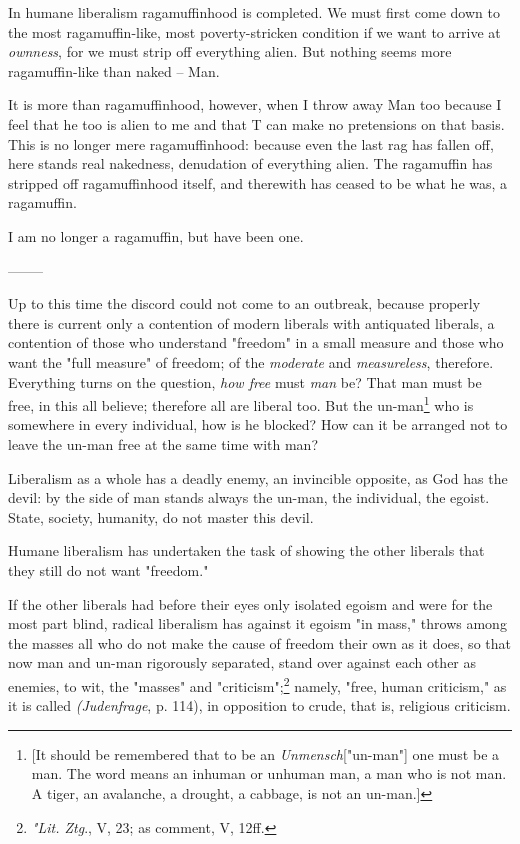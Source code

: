 \documentclass[a4paper]{book}
\begin{document}
In humane liberalism ragamuffinhood is completed. We must first come down to 
the most ragamuffin-like, most poverty-stricken condition if we want to arrive 
at \textit{ownness}, for we must strip off everything alien. But nothing seems 
more ragamuffin-like than naked -- Man.

It is more than ragamuffinhood, however, when I throw away Man too because I 
feel that he too is alien to me and that T can make no pretensions on that 
basis. This is no longer mere ragamuffinhood: because even the last rag has 
fallen off, here stands real nakedness, denudation of everything alien. The 
ragamuffin has stripped off ragamuffinhood itself, and therewith has ceased to 
be what he was, a ragamuffin.

I am no longer a ragamuffin, but have been one.

\begin{center}
--------\end{center}


Up to this time the discord could not come to an outbreak, because properly 
there is current only a contention of modern liberals with antiquated 
liberals, a contention of those who understand "{}freedom"{} in a small 
measure and those who want the "{}full measure"{} of freedom; of the 
\textit{moderate} and \textit{measureless}, therefore. Everything turns on the 
question, \textit{how free} must \textit{man} be? That man must be free, in 
this all believe; therefore all are liberal too. But the un-man\footnote{[It 
should be remembered that to be an \textit{Unmensch}["{}un-man"{}] one must be 
a man. The word means an inhuman or unhuman man, a man who is not man. A 
tiger, an avalanche, a drought, a cabbage, is not an un-man.]} who is 
somewhere in every individual, how is he blocked? How can it be arranged not 
to leave the un-man free at the same time with man?

Liberalism as a whole has a deadly enemy, an invincible opposite, as God has 
the devil: by the side of man stands always the un-man, the individual, the 
egoist. State, society, humanity, do not master this devil.

Humane liberalism has undertaken the task of showing the other liberals that 
they still do not want "{}freedom."{}

If the other liberals had before their eyes only isolated egoism and were for 
the most part blind, radical liberalism has against it egoism "{}in mass,"{} 
throws among the masses all who do not make the cause of freedom their own as 
it does, so that now man and un-man rigorously separated, stand over against 
each other as enemies, to wit, the "{}masses"{} and 
"{}criticism"{};\footnote{\textit{"{}Lit. Ztg}., V, 23; as comment, V, 12ff.} 
namely, "{}free, human criticism,"{} as it is called \textit{(Judenfrage}, p. 
114), in opposition to crude, that is, religious criticism.
\end{document}
